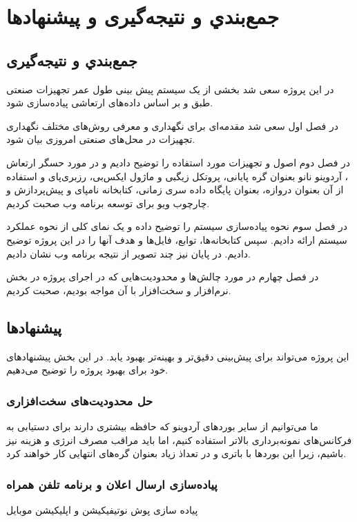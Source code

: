 \chapter{جمع‌بندي و نتيجه‌گيری و پیشنهادها}
\section{جمع‌بندي و نتيجه‌گيری}

در این پروژه سعی شد بخشی از یک سیستم پیش بینی طول عمر تجهیزات صنعتی طبق \cite{jung2017vibration} و بر اساس داده‌های ارتعاشی پیاده‌سازی شود.

در فصل اول سعی شد مقدمه‌ای برای نگهداری و معرفی روش‌های مختلف نگهداری تجهیزات در محل‌‌های صنعتی امروزی بیان شود.

در فصل دوم اصول و تجهیزات مورد استفاده را توضیح دادیم و در مورد حسگر ارتعاش ، آردوینو نانو بعنوان گره پایانی، پروتکل زیگبی و ماژول ایکس‌بی، رزبری‌پای و استفاده از آن بعنوان دروازه،  بعنوان پایگاه داده سری زمانی، کتابخانه نامپای و پیش‌پردازش و چارچوب ویو برای توسعه برنامه وب صحبت کردیم.

در فصل سوم نحوه پیاده‌سازی سیستم را توضیح داده و یک نمای کلی از نحوه عملکرد سیستم ارائه دادیم. سپس کتابخانه‌ها، توابع، فایل‌ها و هدف آنها را در این پروژه توضیح دادیم. در پایان نیز چند تصویر از نتیجه برنامه وب نشان دادیم.

در فصل چهارم در مورد چالش‌ها و محدودیت‌هایی که در اجرای پروژه در بخش نرم‌افزار و سخت‌افزار با آن مواجه بودیم، صحبت کردیم.

\section{پیشنهادها}

این پروژه می‌تواند برای پیش‌بینی دقیق‌تر و بهینه‌تر بهبود یابد. در این بخش پیشنهادهای خود برای بهبود پروژه را توضیح می‌دهیم.

\subsection{حل محدودیت‌های سخت‌افزاری}

ما می‌توانیم از سایر بوردهای آردوینو که حافظه بیشتری دارند برای دستیابی به فرکانس‌های نمونه‌برداری بالاتر استفاده کنیم، اما باید مراقب مصرف انرژی و هزینه نیز باشیم، زیرا این بوردها با باتری و در تعداذ زیاد بعنوان گره‌های انتهایی کار خواهند کرد.

\subsection{پیاده‌سازی ارسال اعلان و برنامه تلفن همراه}
پیاده سازی پوش نوتیفیکیشن و اپلیکیشن موبایل

